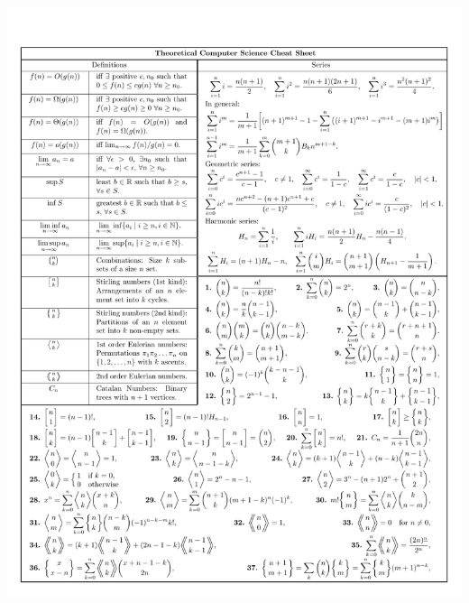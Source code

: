 \documentclass[10pt]{article}
\title{\vspace{-4ex}\Large{}}
\author{}
\date{}
\begin{document}
\begin{landscape}
    \begin{multicols}{3}
        
        \maketitle
        \vspace{-13ex}
        \tableofcontents
        \pagestyle{fancy}
        
        
    \end{multicols}
\end{landscape}

\centerline{\includegraphics[trim={0 0 0 3cm}, clip, width=\textwidth]{cheatsheet/p01.pdf}}
\end{document}
